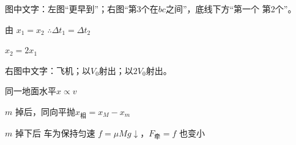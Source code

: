 图中文字：左图“更早到”；右图“第3个在$bc$之间”，底线下方“第一个 第2个”。

\begin{minipage}[t]{0.47\linewidth}
由 $x_1=x_2$ $\therefore\Delta t_1=\Delta t_2$
\end{minipage}\hfill
\begin{minipage}[t]{0.50\linewidth}
$x_2=2x_1$
\end{minipage}

右图中文字：飞机；以$V_0$射出；以$2V_0$射出。

同一地面\quad 水平\quad $x\propto v$


$m$ 掉后，同向平抛$x_{\text{相}}=x_M-x_m$

$m$ 掉下后 车为保持匀速 $f=\mu Mg\downarrow$，$F_{\text{牵}}=f$ 也变小

